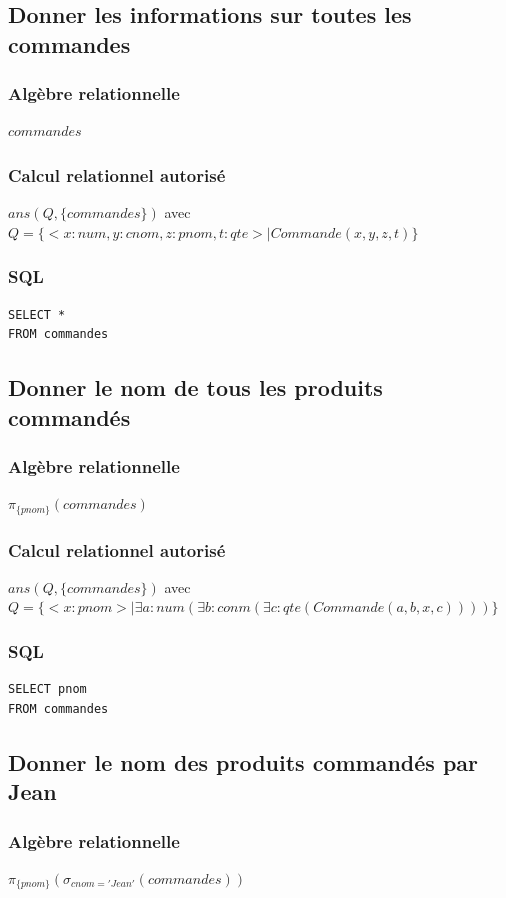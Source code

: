 \documentclass[10pt,a4paper,twoside]{article}
\begin{document}
\subsection{Donner les informations sur toutes les commandes}
\subsubsection{Algèbre relationnelle}
$commandes$
\subsubsection{Calcul relationnel autorisé}
$ans(Q,\{commandes\})$ avec $Q=\{<x:num,y:cnom,z:pnom,t:qte> \mid Commande(x,y,z,t)\}$
\subsubsection{SQL}
\begin{verbatim}
SELECT * 
FROM commandes
\end{verbatim}

\subsection{Donner le nom de tous les produits commandés}
\subsubsection{Algèbre relationnelle}
$\pi_{\{pnom\}}(commandes)$
\subsubsection{Calcul relationnel autorisé}
$ans(Q,\{commandes\})$ avec $Q=\{<x:pnom> \mid \exists a:num(\exists b:conm(\exists c:qte(Commande(a,b,x,c))))\}$
\subsubsection{SQL}
\begin{verbatim}
SELECT pnom 
FROM commandes
\end{verbatim}

\subsection{Donner le nom des produits commandés par Jean}
\subsubsection{Algèbre relationnelle}
$\pi_{\{pnom\}}(\sigma_{cnom='Jean'}(commandes))$
\end{document}
